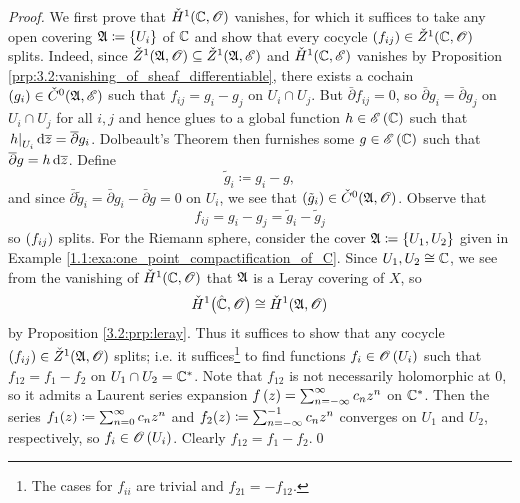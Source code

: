 \documentclass[../Moduli_Spaces_of_Riemann_Surfaces.tex]{subfiles}
\begin{document}
    \begin{proof}
        We first prove that $\check{H}^1\!\left(\mathbb{C},\mathscr{O}\right)$ vanishes, for which it suffices to take any open covering $\mathfrak{A}\coloneqq\left\{U_i\right\}$ of $\mathbb{C}$ and show that every cocycle $\left(f_{ij}\right)\in\check{Z}^1\!\left(\mathbb{C},\mathscr{O}\right)$ splits. Indeed, since $\check{Z}^1\!\left(\mathfrak{A},\mathscr{O}\right)\subseteq\check{Z}^1\!\left(\mathfrak{A},\mathscr{E}\right)$ and $\check{H}^1\!\left(\mathbb{C},\mathscr{E}\right)$ vanishes by Proposition \ref{prp:3.2:vanishing_of_sheaf_differentiable}, there exists a cochain $\left(g_i\right)\in\check{C}^0\!\left(\mathfrak{A},\mathscr{E}\right)$ such that $f_{ij}=g_i-g_j$ on $U_i\cap U_j$. But $\bar{\partial}f_{ij}=0$, so $\bar{\partial}g_i=\bar{\partial}g_j$ on $U_i\cap U_j$ for all $i,j$ and hence glues to a global function $h\in\mathscr{E}\left(\mathbb{C}\right)$ such that $\left.h\right|_{U_i}\mathrm{d}\overline{z}=\overline{\partial}g_i$. Dolbeault's Theorem then furnishes some $g\in\mathscr{E}\left(\mathbb{C}\right)$ such that $\overline{\partial}g=h\,\mathrm{d}\overline{z}$. Define
        \begin{equation*}
            \tilde{g}_i\coloneqq g_i-g,
        \end{equation*}
        and since $\bar{\partial}\tilde{g}_i=\bar{\partial} g_i-\bar{\partial}g=0$ on $U_i$, we see that $\left(\tilde{g}_i\right)\in\check{C}^0\!\left(\mathfrak{A},\mathscr{O}\right)$. Observe that
        \begin{equation*}
            f_{ij}=g_i-g_j=\tilde{g}_i-\tilde{g}_j
        \end{equation*}
        so $\left(f_{ij}\right)$ splits. For the Riemann sphere, consider the cover $\mathfrak{A}\coloneqq\left\{U_1,U_2\right\}$ given in Example \ref{1.1:exa:one_point_compactification_of_C}. Since $U_1,U_2\cong\mathbb{C}$, we see from the vanishing of $\check{H}^1\!\left(\mathbb{C},\mathscr{O}\right)$ that $\mathfrak{A}$ is a Leray covering of $X$, so
        \begin{equation*}
            \check{H}^1\big(\hat{\mathbb{C}},\mathscr{O}\big)\cong\check{H}^1\!\left(\mathfrak{A},\mathscr{O}\right)
        \end{equation*}
        by Proposition \ref{3.2:prp:leray}. Thus it suffices to show that any cocycle $\left(f_{ij}\right)\in\check{Z}^1\!\left(\mathfrak{A},\mathscr{O}\right)$ splits; i.e. it suffices\footnote{The cases for $f_{ii}$ are trivial and $f_{21}=-f_{12}$.} to find functions $f_i\in\mathscr{O}\left(U_i\right)$ such that $f_{12}=f_1-f_2$ on $U_1\cap U_2=\mathbb{C}^\ast$. Note that $f_{12}$ is not necessarily holomorphic at $0$, so it admits a Laurent series expansion $f\left(z\right)=\sum_{n=-\infty}^{\infty}c_nz^n$ on $\mathbb{C}^\ast$. Then the series $f_1\!\left(z\right)\coloneqq\sum_{n=0}^{\infty}c_nz^n$ and $f_2\!\left(z\right)\coloneqq\sum_{n=-\infty}^{-1}c_nz^n$ converges on $U_1$ and $U_2$, respectively, so $f_i\in\mathscr{O}\left(U_i\right)$. Clearly $f_{12}=f_1-f_2$.\qed
    \end{proof}
\end{document}
